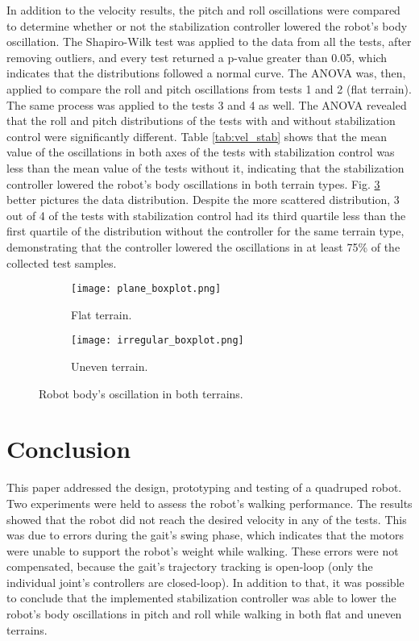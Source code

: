 \documentclass[conference]{IEEEtran}
\begin{document}
In addition to the velocity results, the pitch and roll oscillations were compared to determine whether or not the stabilization controller lowered the robot's body oscillation. The Shapiro-Wilk test was applied to the data from all the tests, after removing outliers, and every test returned a p-value greater than 0.05, which indicates that the distributions followed a normal curve. The ANOVA was, then, applied to compare the roll and pitch oscillations from tests 1 and 2 (flat terrain). The same process was applied to the tests 3 and 4 as well. The ANOVA revealed that the roll and pitch distributions of the tests with and without stabilization control were significantly different. Table \ref{tab:vel_stab} shows that the mean value of the oscillations in both axes of the tests with stabilization control was less than the mean value of the tests without it, indicating that the stabilization controller lowered the robot's body oscillations in both terrain types. Fig. \ref{fig:imu_test} better pictures the data distribution. Despite the more scattered distribution, 3 out of 4 of the tests with stabilization control had its third quartile less than the first quartile of the distribution without the controller for the same terrain type, demonstrating that the controller lowered the oscillations in at least 75\% of the collected test samples.
\vspace{0.1\baselineskip}

\begin{figure}[!b]
  \centering
  \begin{subfigure}[t]{0.49\textwidth}
    \centering
    \texttt{[image: plane\_boxplot.png]}
    \caption{Flat terrain.}
    \label{fig:imu_test_plane}
  \end{subfigure}
  \begin{subfigure}[t]{0.49\textwidth}
    \centering
    \texttt{[image: irregular\_boxplot.png]}
    \caption{Uneven terrain.}
    \label{fig:imu_test_irregular}
  \end{subfigure}
  \caption{Robot body's oscillation in both terrains.}
  \label{fig:imu_test}
  \vspace{-1.5\baselineskip}
\end{figure}

\section{Conclusion} \label{conclusion}

This paper addressed the design, prototyping and testing of a quadruped robot. Two experiments were held to assess the robot's walking performance. The results showed that the robot did not reach the desired velocity in any of the tests. This was due to errors during the gait's swing phase, which indicates that the motors were unable to support the robot's weight while walking. These errors were not compensated, because the gait's trajectory tracking is open-loop (only the individual joint's controllers are closed-loop). In addition to that, it was possible to conclude that the implemented stabilization controller was able to lower the robot's body oscillations in pitch and roll while walking in both flat and uneven terrains.
\end{document}
